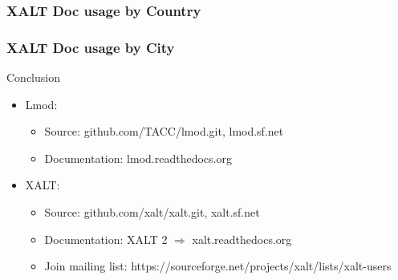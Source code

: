\documentclass{beamer}
\begin{document}
\begin{frame}[fragile]
    \frametitle{XALT Doc usage by Country}
\end{frame}

\begin{frame}[fragile]
    \frametitle{XALT Doc usage by City}
\end{frame}

\begin{frame}{Conclusion}
  \begin{itemize}
    \item Lmod:
      \begin{itemize}
        \item Source: github.com/TACC/lmod.git, lmod.sf.net
        \item Documentation: lmod.readthedocs.org
      \end{itemize}
    \item XALT:
      \begin{itemize}
        \item Source: github.com/xalt/xalt.git, xalt.sf.net
        \item Documentation: XALT 2 $\Rightarrow$ xalt.readthedocs.org
        \item Join mailing list: https://sourceforge.net/projects/xalt/lists/xalt-users
      \end{itemize}
  \end{itemize}
\end{frame}

%
\end{document}
